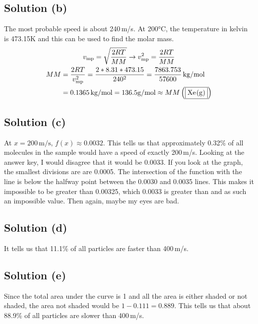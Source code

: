\documentclass[10pt]{article}
\begin{document}
        \subsection{Solution (b)}
            The most probable speed is about 240\,\unit{\meter/\second}. 
            At 200\unit{\celsius}, the temperature in kelvin is 473.15\unit{\kelvin} and this can be used to find the molar mass.
            \begin{gather}
                v_{\rm mp}  =   \sqrt{\frac{2RT}{MM}}   \to
                v_{\rm mp}^2=   \frac{2RT}{MM}\\
                \begin{align}
                    MM  &=  \frac{2RT}{v_{\rm mp}^2}
                        =   \frac{2*8.31*473.15}{240^2}
                        =   \frac{7863.753}{57600}\,\unit{\kilo\gram/\mole}\\
                        &=  0.1365\,\unit{\kilo\gram/\mole}
                        =   136.5\unit{\gram/\mole}
                        \approx MM\left( \boxed{\ce{Xe(g)}} \right)
                \end{align}
            \end{gather}

        \subsection{Solution (c)}
            At $x = 200\,\unit{\meter/\second}$, $f(x) \approx \boxed{0.0032}$.
            This tells us that approximately 0.32\% of all molecules in the sample would have a speed of exactly 200\,\unit{\meter/\second}. 
            Looking at the answer key, I would disagree that it would be 0.0033. 
            If you look at the graph, the smallest divisions are are 0.0005.
            The intersection of the function with the line is below the halfway point between the 0.0030 and 0.0035 lines.
            This makes it impossible to be greater than 0.00325, which 0.0033 is greater than and as such an impossible value.
            Then again, maybe my eyes are bad.

        \subsection{Solution (d)}
            It tells us that 11.1\% of all particles are faster than 400\,\unit{\meter/\second}.

        \subsection{Solution (e)}
            Since the total area under the curve is 1 and all the area is either shaded or not shaded, the area not shaded would be $1 - 0.111 = \boxed{0.889}$.
            This tells us that about 88.9\% of all particles are slower than 400\,\unit{\meter/\second}.
\end{document}
